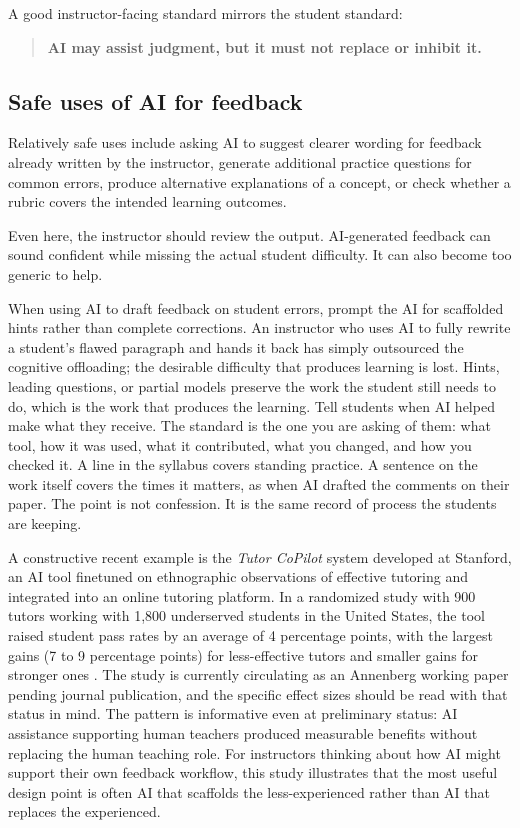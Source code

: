 \documentclass{SIAMbook2023}
\begin{document}
A good instructor-facing standard mirrors the student standard:

\begin{quote}
\textbf{AI may assist judgment, but it must not replace or inhibit it.}
\end{quote}

\subsection{Safe uses of AI for feedback}
\label{i:subsec:safe-feedback}

Relatively safe uses include asking AI to suggest clearer wording for feedback already written by the instructor, generate additional practice questions for common errors, produce alternative explanations of a concept, or check whether a rubric covers the intended learning outcomes.

Even here, the instructor should review the output. AI-generated feedback can sound confident while missing the actual student difficulty. It can also become too generic to help.

When using AI to draft feedback on student errors, prompt the AI for scaffolded hints rather than complete corrections. An instructor who uses AI to fully rewrite a student's flawed paragraph and hands it back has simply outsourced the cognitive offloading; the desirable difficulty \citep{bjork2011making} that produces learning is lost. Hints, leading questions, or partial models preserve the work the student still needs to do, which is the work that produces the learning. Tell students when AI helped make what they receive. The standard is the one you are asking of them: what tool, how it was used, what it contributed, what you changed, and how you checked it. A line in the syllabus covers standing practice. A sentence on the work itself covers the times it matters, as when AI drafted the comments on their paper. The point is not confession. It is the same record of process the students are keeping.

A constructive recent example is the \emph{Tutor CoPilot} system developed at Stanford, an AI tool finetuned on ethnographic observations of effective tutoring and integrated into an online tutoring platform. In a randomized study with 900 tutors working with 1,800 underserved students in the United States, the tool raised student pass rates by an average of 4 percentage points, with the largest gains (7 to 9 percentage points) for less-effective tutors and smaller gains for stronger ones \citep{wang2024tutor}. The study is currently circulating as an Annenberg working paper pending journal publication, and the specific effect sizes should be read with that status in mind. The pattern is informative even at preliminary status: AI assistance supporting human teachers produced measurable benefits without replacing the human teaching role. For instructors thinking about how AI might support their own feedback workflow, this study illustrates that the most useful design point is often AI that scaffolds the less-experienced rather than AI that replaces the experienced.
\end{document}
